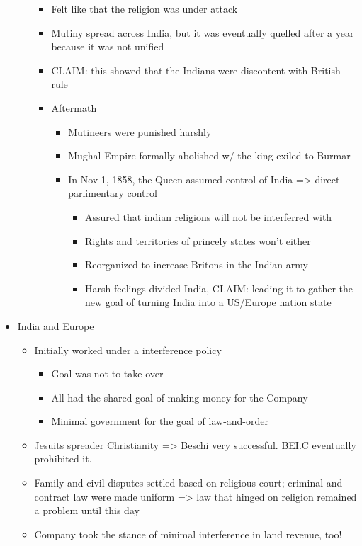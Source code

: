 \documentclass[letterpaper]{article}
\begin{document}
\begin{itemize}
\begin{itemize}
\begin{itemize}
\item Felt like that the religion was under attack
\item Mutiny spread across India, but it was eventually quelled after a
year because it was not unified
\item CLAIM: this showed that the Indians were discontent with British
rule
\item Aftermath

\begin{itemize}
\item Mutineers were punished harshly
\item Mughal Empire formally abolished w/ the king exiled to Burmar
\item In Nov 1, 1858, the Queen assumed control of India => direct
parlimentary control

\begin{itemize}
\item Assured that indian religions will not be interferred with
\item Rights and territories of princely states won't either
\item Reorganized to increase Britons in the Indian army
\item Harsh feelings divided India, CLAIM: leading it to gather the
new goal of turning India into a US/Europe nation state
\end{itemize}
\end{itemize}
\end{itemize}
\end{itemize}

\item India and Europe

\begin{itemize}
\item Initially worked under a interference policy

\begin{itemize}
\item Goal was not to take over
\item All had the shared goal of making money for the Company
\item Minimal government for the goal of law-and-order
\end{itemize}

\item Jesuits spreader Christianity => Beschi very successful. BEI.C
eventually prohibited it.
\item Family and civil disputes settled based on religious court; criminal
and contract law were made uniform => law that hinged on religion
remained a problem until this day
\item Company took the stance of minimal interference in land revenue,
too!


\end{itemize}
\end{itemize}
\end{document}
